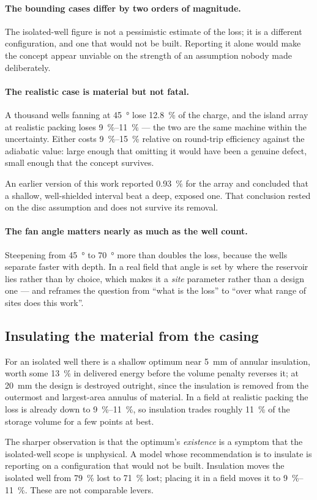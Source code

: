 \paragraph{The bounding cases differ by two orders of magnitude.} The
isolated-well figure is not a pessimistic estimate of the loss; it is a
different configuration, and one that would not be built. Reporting it alone
would make the concept appear unviable on the strength of an assumption nobody
made deliberately.

\paragraph{The realistic case is material but not fatal.} A thousand wells
fanning at \SI{45}{\degree} lose \SI{12.8}{\percent} of the charge, and the
island array at realistic packing loses \SIrange{9}{11}{\percent} --- the two
are the same machine within the uncertainty. Either costs
\SIrange{9}{15}{\percent} relative on round-trip efficiency against the
adiabatic value: large enough that omitting it would have been a genuine
defect, small enough that the concept survives.

An earlier version of this work reported \SI{0.93}{\percent} for the array and
concluded that a shallow, well-shielded interval beat a deep, exposed one.
That conclusion rested on the disc assumption and does not survive its
removal.

\paragraph{The fan angle matters nearly as much as the well count.} Steepening
from \SI{45}{\degree} to \SI{70}{\degree} more than doubles the loss, because
the wells separate faster with depth. In a real field that angle is set by
where the reservoir lies rather than by choice, which makes it a \emph{site}
parameter rather than a design one --- and reframes the question from ``what is
the loss'' to ``over what range of sites does this work''.

\subsection{Insulating the material from the casing}

For an isolated well there is a shallow optimum near \SI{5}{\milli\metre} of
annular insulation, worth some \SI{13}{\percent} in delivered energy before
the volume penalty reverses it; at \SI{20}{\milli\metre} the design is
destroyed outright, since the insulation is removed from the outermost and
largest-area annulus of material. In a field at realistic packing the loss is
already down to \SIrange{9}{11}{\percent}, so insulation trades roughly
\SI{11}{\percent} of the storage volume for a few points at best.

The sharper observation is that the optimum's \emph{existence} is a symptom
that the isolated-well scope is unphysical. A model whose recommendation is to
insulate is reporting on a configuration that would not be built. Insulation
moves the isolated well from \SI{79}{\percent} lost to \SI{71}{\percent} lost;
placing it in a field moves it to \SIrange{9}{11}{\percent}. These are not
comparable levers.

